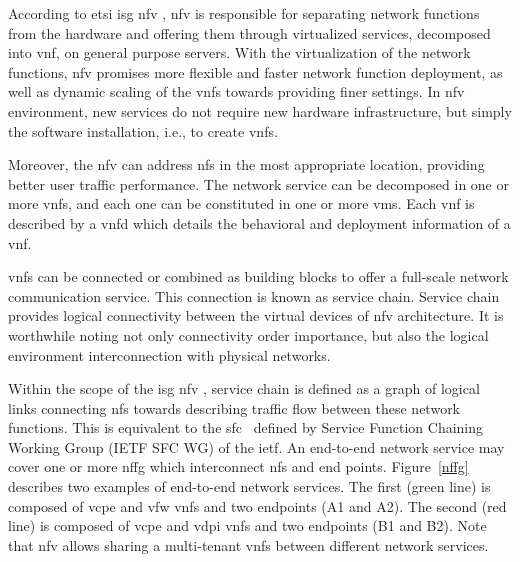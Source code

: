 According to \gls{etsi} \gls{isg} \gls{nfv} \cite{ETSIIndustrySpecificationGroupISGNFV2014NetworkNFV},  \acrlong{nfv} is responsible for separating network functions from the hardware and offering them through virtualized services, decomposed into \gls{vnf}, on general purpose servers. With the virtualization of the network functions, \gls{nfv} promises more flexible and faster network function deployment, as well as dynamic scaling of the \glspl{vnf} towards providing finer settings. In \gls{nfv} environment, new services do not require new hardware infrastructure, but simply the software installation, i.e., to create \glspl{vnf}.

Moreover, the \gls{nfv} can address \glspl{nf} in the most appropriate location, providing better user traffic performance. The network service can be decomposed in one or more \glspl{vnf}, and each one can be constituted in one or more \glspl{vm}. Each \gls{vnf} is described by a \gls{vnfd} which details the behavioral and deployment information of a \gls{vnf}.

\glspl{vnf} can be connected or combined as building blocks to offer a full-scale network communication service. This connection is known as service chain. Service chain provides logical connectivity between the virtual devices of \gls{nfv} architecture. It is worthwhile noting not only connectivity order importance, but also the logical environment interconnection with physical networks. 

Within the scope of the \gls{isg} \gls{nfv} \cite{ETSIIndustrySpecificationGroupISGNFV2014NetworkNFV}, service chain is defined as a graph of logical links connecting \glspl{nf} towards describing traffic flow between these network functions. This is equivalent to the \gls{sfc}~\cite{Halpern2015} defined by Service Function Chaining Working Group (IETF SFC WG) of the \gls{ietf}.  
An end-to-end network service may cover one or more \gls{nffg} which interconnect \glspl{nf} and end points.  Figure~\ref{nffg} describes two examples of end-to-end network services. The first (green line) is composed of \gls{vcpe} and \gls{vfw} \glspl{vnf} and two endpoints (A1 and A2). The second (red line) is composed of \gls{vcpe} and \gls{vdpi} \glspl{vnf} and two endpoints (B1 and B2). Note that \gls{nfv} allows sharing a multi-tenant \glspl{vnf} between different network services. 

